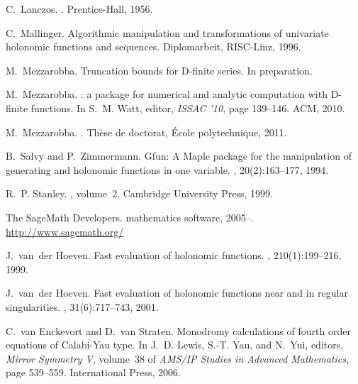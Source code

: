 \documentclass[runningheads,a4paper]{llncs}
\begin{document}
\begin{thebibliography}{10}
C.~Lanczos.
.
\newblock Prentice-Hall, 1956.

C.~Mallinger.
\newblock Algorithmic manipulation and transformations of univariate holonomic
  functions and sequences.
\newblock Diplomarbeit, RISC-Linz, 1996.

M.~Mezzarobba.
\newblock Truncation bounds for {D}-finite series.
\newblock In preparation.

M.~Mezzarobba.
: a package for numerical and analytic computation with
  {D}-finite functions.
\newblock In S.~M. Watt, editor, {\em {ISSAC} '10}, page 139–146. ACM, 2010.

M.~Mezzarobba.
.
\newblock Thèse de doctorat, École polytechnique, 2011.

B.~Salvy and P.~Zimmermann.
\newblock Gfun: A {M}aple package for the manipulation of generating and
  holonomic functions in one variable.
, 20(2):163–177,
  1994.

R.~P. Stanley.
, volume~2.
\newblock Cambridge University Press, 1999.

{The SageMath Developers}.
 mathematics software, 2005–.
\newblock \url{http://www.sagemath.org/}

J.~van~der Hoeven.
\newblock Fast evaluation of holonomic functions.
, 210(1):199–216, 1999.

J.~van~der Hoeven.
\newblock Fast evaluation of holonomic functions near and in regular
  singularities.
, 31(6):717–743, 2001.

C.~van Enckevort and D.~van Straten.
\newblock Monodromy calculations of fourth order equations of {C}alabi-{Y}au
  type.
\newblock In J.~D. Lewis, S.-T. Yau, and N.~Yui, editors, {\em Mirror Symmetry
  {V}}, volume~38 of {\em AMS/IP Studies in Advanced Mathematics}, page
  539–559. International Press, 2006.

\end{thebibliography}
\end{document}

